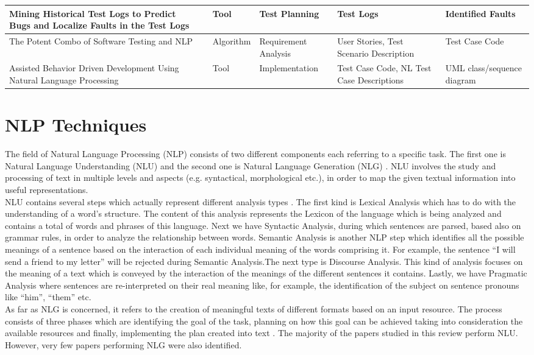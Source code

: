 \begin{longtable}{|p{3cm}|p{1cm}|p{2.5cm}|p{2.8cm}|p{2.5cm}|p{2.5cm}|}
            \hline Mining Historical Test Logs to Predict Bugs and Localize Faults in the Test Logs & \cite{8812113} & Tool& Test Planning & Test Logs & Identified Faults\\
            \hline The Potent Combo of Software Testing and NLP & \cite{mulla2020potent} & Algorithm& Requirement Analysis& User Stories, Test Scenario Description & Test Case Code\\
            \hline Assisted Behavior Driven Development Using Natural Language Processing & \cite{soeken2012assisted} & Tool& Implementation & Test Case Code, NL Test Case Descriptions & UML class/sequence diagram\\
        \hline
\end{longtable}

\section{NLP Techniques}
The field of Natural Language Processing (NLP) consists of two different components each referring to a specific task. The first one is Natural Language Understanding (NLU) and the second one is Natural Language 
Generation (NLG) \cite{liddy2001natural, khurana2017natural}. NLU involves the study and processing of text in multiple levels and aspects (e.g. syntactical, morphological etc.), in order to map the given textual 
information into useful representations. \\
NLU contains several steps which actually represent different analysis types \cite{liddy2001natural}. The first kind is Lexical Analysis which has to do with the understanding of a word's structure. 
The content of this analysis represents the Lexicon of the language which is being analyzed and contains a total of words and phrases of this language. Next we have Syntactic Analysis, during which sentences are parsed, 
based also on grammar rules, in order to analyze the relationship between words. Semantic Analysis is another NLP 
step which identifies all the possible meanings of a sentence based on the interaction of each individual meaning of the words comprising it.  For example, the sentence ``I will send a friend to my letter'' will be rejected 
during Semantic Analysis.The next type is Discourse Analysis. This kind of analysis focuses on the meaning of a text which is conveyed by the interaction of the meanings of the different sentences it contains. Lastly, we have 
Pragmatic Analysis where sentences are re-interpreted on their real meaning like, for example, the identification of the subject on sentence pronouns like ``him'', ``them'' etc.\\ As far as NLG is concerned, 
it refers to the creation of meaningful texts of different formats based on an input resource. The process consists of three phases which are identifying the goal of the task, planning on how this goal can 
be achieved taking into consideration the available resources and finally, implementing the plan created into text \cite{khurana2017natural}. The majority of the papers studied in this review perform NLU. 
However, very few papers performing NLG were also identified.

